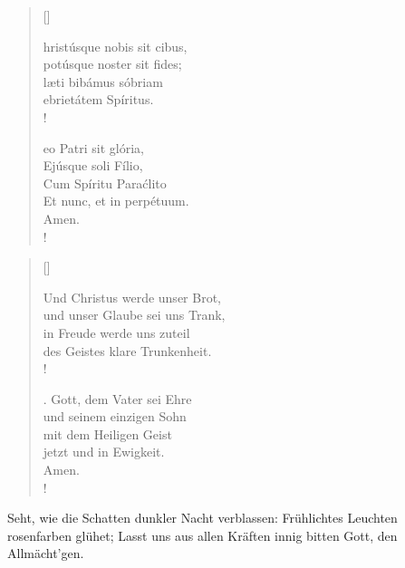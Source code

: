 \begin{multicols}{2}
\begin{verse}[\versewidth]

{\small{hristúsque nobis sit cibus, \\
potúsque noster sit fides;\\
læti bibámus sóbriam\\
ebrietátem Spíritus.\\!

eo Patri sit glória,\\
Ejúsque soli Fílio,\\
Cum Spíritu Paraćlito\\
Et nunc, et in perpétuum.\\
Amen.\\!}}

\end{verse}

\columnbreak

\begin{verse}[\versewidth]

{\small\rm{ Und Christus werde unser Brot,\\
und unser Glaube sei uns Trank,\\
in Freude werde uns zuteil\\
des Geistes klare Trunkenheit.\\!

. Gott, dem Vater sei Ehre\\
und seinem einzigen Sohn\\
mit dem Heiligen Geist\\
jetzt und in Ewigkeit.\\
Amen.\\!}}
\end{verse}

\end{multicols}

\medskip

\def\greinitialformat#1{{\fontsize{40}{40}\selectfont #1}}
\gresetfirstlineaboveinitial{\small \textcolor{red}{æstate}}{}
\setaboveinitialseparation{0.72mm}

\medskip

\begin{sloppypar}
{\noindent\rm{ Seht, wie die Schatten
dunkler Nacht verblassen: Früh\-lichtes Leuchten
rosenfarben glühet; Lasst uns aus allen Kräften
innig bitten Gott, den Allmächt’gen.}}
\end{sloppypar}

